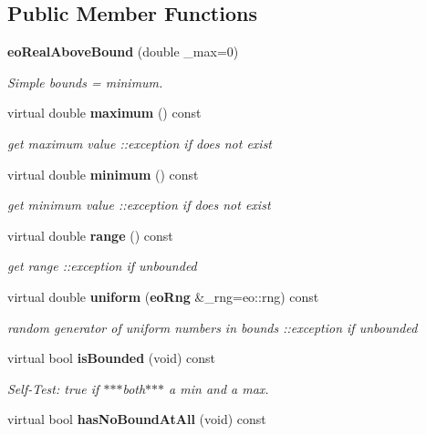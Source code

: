 \subsection*{Public Member Functions}
\begin{CompactItemize}
\item 
{\bf eo\-Real\-Above\-Bound} (double \_\-max=0)\label{classeo_real_above_bound_a1}

\begin{CompactList}\small\item\em Simple bounds = minimum. \item\end{CompactList}\item 
virtual double {\bf maximum} () const \label{classeo_real_above_bound_a2}

\begin{CompactList}\small\item\em get maximum value ::exception if does not exist \item\end{CompactList}\item 
virtual double {\bf minimum} () const \label{classeo_real_above_bound_a3}

\begin{CompactList}\small\item\em get minimum value ::exception if does not exist \item\end{CompactList}\item 
virtual double {\bf range} () const \label{classeo_real_above_bound_a4}

\begin{CompactList}\small\item\em get range ::exception if unbounded \item\end{CompactList}\item 
virtual double {\bf uniform} ({\bf eo\-Rng} \&\_\-rng=eo::rng) const \label{classeo_real_above_bound_a5}

\begin{CompactList}\small\item\em random generator of uniform numbers in bounds ::exception if unbounded \item\end{CompactList}\item 
virtual bool {\bf is\-Bounded} (void) const \label{classeo_real_above_bound_a6}

\begin{CompactList}\small\item\em Self-Test: true if $\ast$$\ast$$\ast$both$\ast$$\ast$$\ast$ a min and a max. \item\end{CompactList}\item 
virtual bool {\bf has\-No\-Bound\-At\-All} (void) const \label{classeo_real_above_bound_a7}


\end{CompactItemize}
